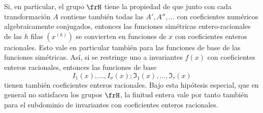 \documentclass[11pt]{article}
\begin{document}
Si, en particular, el grupo \(\frH\) tiene la propiedad de que junto con cada transformación \(A\) contiene también todas las \(A',A'',\ldots\) con coeficientes numéricos algebraicamente conjugados, entonces las funciones simétricas entero-racionales de las \(h\) filas \((x^{(k)})\) se convierten en funciones de \(x\) con coeficientes enteros racionales. Esto vale en particular también para las funciones de base de las funciones simétricas. Así, si se restringe uno a invariantes \(f(x)\) con coeficientes enteros racionales, entonces las funciones de base
\[
        I_1(x),\ldots,I_\sigma(x);\mathfrak I_1(x),\ldots,\mathfrak I_\tau(x)
\]
tienen también coeficientes enteros racionales. Bajo esta hipótesis especial, que en general no satisfacen los grupos \(\frH\), la finitud entera vale por tanto también para el subdominio de invariantes con coeficientes enteros racionales.
\end{document}
